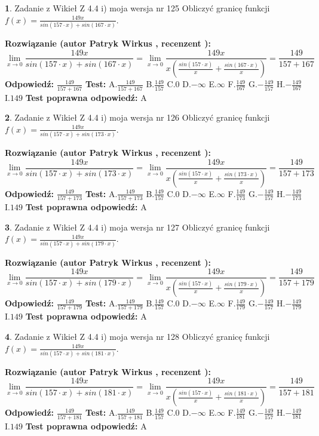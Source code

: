 \documentclass[12pt, a4paper]{article}
\theoremstyle{definition} %
\newtheorem{zad}{}
\newcommand{\zadStart}[1]{\begin{zad}#1\newline}
\newcommand{\zadStop}{\end{zad}}
\newcommand{\rozwStart}[2]{\noindent \textbf{Rozwiązanie (autor #1 , recenzent #2): }\newline}
\newcommand{\rozwStop}{\newline}
\newcommand{\odpStart}{\noindent \textbf{Odpowiedź:}\newline}
\newcommand{\odpStop}{\newline}
\newcommand{\testStart}{\noindent \textbf{Test:}\newline}
\newcommand{\testStop}{\newline}
\newcommand{\kluczStart}{\noindent \textbf{Test poprawna odpowiedź:}\newline}
\newcommand{\kluczStop}{\newline}
\begin{document}
\zadStart{Zadanie z Wikieł Z 4.4 i) moja wersja nr 125}
Obliczyć granicę funkcji $f(x)=\frac{149x}{sin(157\cdot x) +sin(167\cdot x)}$.
\zadStop
\rozwStart{Patryk Wirkus}{}
$$\lim\limits_{x\to 0}\frac{149x}{sin(157\cdot x) +sin(167\cdot x)}=\lim\limits_{x\to 0}\frac{149x}{x(\frac{sin(157\cdot x)}{x}+\frac{sin(167\cdot x)}{x})}=\frac{149}{157+167}$$
\rozwStop
\odpStart
$\frac{149}{157+167}$
\odpStop
\testStart
A.$\frac{149}{157+167}$
B.$\frac{149}{157}$
C.$0$
D.$-\infty$
E.$\infty$
F.$\frac{149}{167}$
G.$-\frac{149}{157}$
H.$-\frac{149}{167}$
I.$149$
\testStop
\kluczStart
A
\kluczStop



\zadStart{Zadanie z Wikieł Z 4.4 i) moja wersja nr 126}
Obliczyć granicę funkcji $f(x)=\frac{149x}{sin(157\cdot x) +sin(173\cdot x)}$.
\zadStop
\rozwStart{Patryk Wirkus}{}
$$\lim\limits_{x\to 0}\frac{149x}{sin(157\cdot x) +sin(173\cdot x)}=\lim\limits_{x\to 0}\frac{149x}{x(\frac{sin(157\cdot x)}{x}+\frac{sin(173\cdot x)}{x})}=\frac{149}{157+173}$$
\rozwStop
\odpStart
$\frac{149}{157+173}$
\odpStop
\testStart
A.$\frac{149}{157+173}$
B.$\frac{149}{157}$
C.$0$
D.$-\infty$
E.$\infty$
F.$\frac{149}{173}$
G.$-\frac{149}{157}$
H.$-\frac{149}{173}$
I.$149$
\testStop
\kluczStart
A
\kluczStop



\zadStart{Zadanie z Wikieł Z 4.4 i) moja wersja nr 127}
Obliczyć granicę funkcji $f(x)=\frac{149x}{sin(157\cdot x) +sin(179\cdot x)}$.
\zadStop
\rozwStart{Patryk Wirkus}{}
$$\lim\limits_{x\to 0}\frac{149x}{sin(157\cdot x) +sin(179\cdot x)}=\lim\limits_{x\to 0}\frac{149x}{x(\frac{sin(157\cdot x)}{x}+\frac{sin(179\cdot x)}{x})}=\frac{149}{157+179}$$
\rozwStop
\odpStart
$\frac{149}{157+179}$
\odpStop
\testStart
A.$\frac{149}{157+179}$
B.$\frac{149}{157}$
C.$0$
D.$-\infty$
E.$\infty$
F.$\frac{149}{179}$
G.$-\frac{149}{157}$
H.$-\frac{149}{179}$
I.$149$
\testStop
\kluczStart
A
\kluczStop



\zadStart{Zadanie z Wikieł Z 4.4 i) moja wersja nr 128}
Obliczyć granicę funkcji $f(x)=\frac{149x}{sin(157\cdot x) +sin(181\cdot x)}$.
\zadStop
\rozwStart{Patryk Wirkus}{}
$$\lim\limits_{x\to 0}\frac{149x}{sin(157\cdot x) +sin(181\cdot x)}=\lim\limits_{x\to 0}\frac{149x}{x(\frac{sin(157\cdot x)}{x}+\frac{sin(181\cdot x)}{x})}=\frac{149}{157+181}$$
\rozwStop
\odpStart
$\frac{149}{157+181}$
\odpStop
\testStart
A.$\frac{149}{157+181}$
B.$\frac{149}{157}$
C.$0$
D.$-\infty$
E.$\infty$
F.$\frac{149}{181}$
G.$-\frac{149}{157}$
H.$-\frac{149}{181}$
I.$149$
\testStop
\kluczStart
A
\kluczStop
\end{document}
